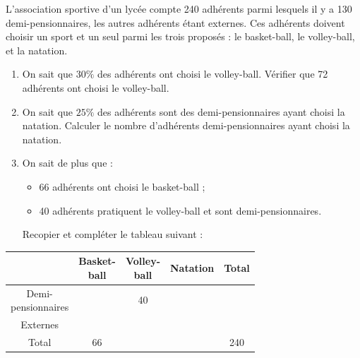 \documentclass[a4paper,11pt]{article}
\begin{document}
\pagestyle{fancy}

\fancyhf{} %
\fancyhead[R]{ {\Niveau}}
\fancyhead[L]{ {\Chapitre}}
\fancyfoot[R]{{\thepage\  / \pageref{LastPage}}}


\begin{multicols}{2}

\begin{exercice}[title=Exercice 1 $\star$ { [Calculer, Représenter] }]{}{}
  L'association sportive d'un lycée compte 240 adhérents parmi lesquels il y a 130 demi-pensionnaires, les autres adhérents étant externes. Ces adhérents doivent choisir un sport et un seul parmi les trois proposés : le basket-ball, le volley-ball, et la natation.
  
  \begin{enumerate}
    \item On sait que $30\%$ des adhérents ont choisi le volley-ball. Vérifier que 72 adhérents ont choisi le volley-ball.
    \item On sait que $25\%$ des adhérents sont des demi-pensionnaires ayant choisi la natation. Calculer le nombre d'adhérents demi-pensionnaires ayant choisi la natation.
    \item On sait de plus que :
      \begin{itemize}[label=$\bullet$]
        \item 66 adhérents ont choisi le basket-ball ;
        \item 40 adhérents pratiquent le volley-ball et sont demi-pensionnaires.
      \end{itemize}
      Recopier et compléter le tableau suivant :
      
  \end{enumerate}
      \begin{center}
      \small
      \renewcommand{\arraystretch}{1.2}
      \begin{tabular}{|c|c|c|c|c|}
      \hline
       & \makecell{Basket-\\ball} & \makecell{Volley-\\ball} & Natation & Total \\ \hline
      \makecell{Demi-\\pensionnaires} & & 40 & & \\ \hline
      Externes & & & & \\ \hline
      Total & 66 & & & 240 \\ \hline
      \end{tabular}
      \end{center}
\end{exercice}


\end{multicols}
\end{document}
